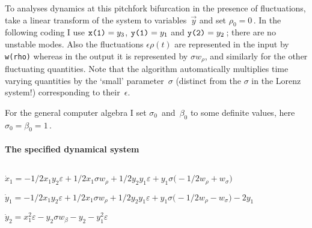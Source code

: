 \documentclass[11pt,a5paper]{article}
\begin{document}
To analyses dynamics at this pitchfork bifurcation in the presence of fluctuations, \cite{Potzsche2006} take a linear transform of the system to variables~$\vec y$ and set $\rho_0=0$\,.
In the following coding I use $\verb|x(1)|=y_3$, $\verb|y(1)|=y_1$ and $\verb|y(2)|=y_2$\,; there are no unstable modes.
Also the fluctuations $\epsilon\rho(t)$ are represented in the input by \verb|w(rho)| whereas in the output it is represented by $\sigma w_\rho$, and similarly for the other fluctuating quantities.
Note that the algorithm automatically multiplies time varying quantities by the `small' parameter~$\sigma$ (distinct from the $\sigma$ in the Lorenz system!) corresponding to their~$\epsilon$.  

For the general computer algebra I set $\sigma_0$~and~$\beta_0$ to some definite values, here $\sigma_0=\beta_0=1$\,.

\paragraph{The specified dynamical system}
\begin{math}
\end{math}\par

\begin{math}
\dot x_{1}=-1/2 x_{1} y_{2} \varepsilon +1/2 x_{1} \sigma  w_{\rho }+1/2
 y_{2} y_{1} \varepsilon +y_{1} \sigma  \big(-1/2 w_{\rho }+w_{\sigma }
\big)
\end{math}\par

\begin{math}
\dot y_{1}=-1/2 x_{1} y_{2} \varepsilon +1/2 x_{1} \sigma  w_{\rho }+1/2
 y_{2} y_{1} \varepsilon +y_{1} \sigma  \big(-1/2 w_{\rho }-w_{\sigma }
\big)-2 y_{1}
\end{math}\par

\begin{math}
\dot y_{2}=x_{1}^{2} \varepsilon -y_{2} \sigma  w_{\beta }-y_{2}-y_{1}^{
2} \varepsilon 
\end{math}\par
\end{document}
